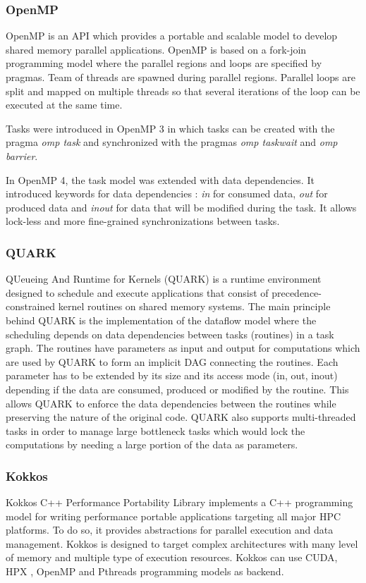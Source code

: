 \subsubsection{OpenMP}
OpenMP \cite{DaguM1998} is an API which provides a portable and scalable model to develop shared memory parallel applications.
OpenMP is based on a fork-join programming model where the parallel regions and loops are specified by pragmas.
Team of threads are spawned during parallel regions.
Parallel loops are split and mapped on multiple threads so that several iterations of the loop can be executed at the same time.

Tasks were introduced in OpenMP 3 \cite{ACDHM2009} in which tasks can be created with the pragma \textit{omp task} and synchronized with the pragmas \textit{omp taskwait} and \textit{omp barrier}.

In OpenMP 4, the task model was extended with data dependencies.
It introduced keywords for data dependencies : \textit{in} for consumed data, \textit{out} for produced data and \textit{inout} for data that will be modified during the task.
It allows lock-less and more fine-grained synchronizations between tasks.

\subsubsection{QUARK}
QUeueing And Runtime for Kernels (QUARK) \cite{YarkKD2011} is a runtime environment designed to schedule and execute applications that consist of precedence-constrained kernel routines on shared memory systems.
The main principle behind QUARK is the implementation of the dataflow model where the scheduling depends on data dependencies between tasks (routines) in a task graph.
The routines have parameters as input and output for computations which are used by QUARK to form an implicit DAG connecting the routines.
Each parameter has to be extended by its size and its access mode (in, out, inout) depending if the data are consumed, produced or modified by the routine.
This allows QUARK to enforce the data dependencies between the routines while preserving the nature of the original code.
QUARK also supports multi-threaded tasks in order to manage large bottleneck tasks which would lock the computations by needing a large portion of the data as parameters.

\subsubsection{Kokkos}
Kokkos C++ Performance Portability Library \cite{CarTS2014} implements a C++ programming model for writing performance portable applications targeting all major HPC platforms.
To do so, it provides abstractions for parallel execution and data management.
Kokkos is designed to target complex architectures with many level of memory and multiple type of execution resources.
Kokkos can use CUDA, HPX \cite{KHASF2014}, OpenMP \cite{DaguM1998} and Pthreads programming models as backend.

